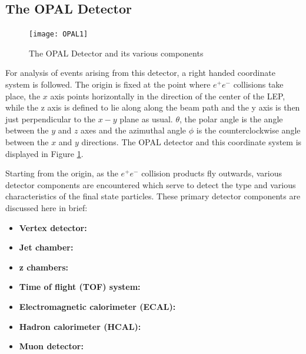 \subsection{The OPAL Detector}
\begin{figure}[H]
\centering
\texttt{[image: OPAL1]}
\caption{The OPAL Detector and its various components}
\label{fig:OPAL}
\end{figure}

For analysis of events arising from this detector, a right handed coordinate system is followed. The origin is fixed at the point where $e^{+}e^{-}$ collisions take place, the $x$ axis points horizontally in the direction of the center of the LEP, while the z axis is defined to lie along along the beam path and the y axis is then just perpendicular to the $x-y$ plane as usual. $\theta$, the polar angle is the angle between the $y$ and $z$ axes and the azimuthal angle $\phi$ is the counterclockwise angle between the $x$ and $y$ directions. The OPAL detector and this coordinate system is displayed in Figure \ref{fig:OPAL}.

Starting from the origin, as the $e^{+}e^{-}$ collision products fly outwards, various detector components are encountered which serve to detect the type and various characteristics of the final state particles. These primary detector components are discussed here in brief:
\begin{itemize}
\item \textbf{Vertex detector:}
\item \textbf{Jet chamber:}
\item \textbf{z chambers:}
\item \textbf{Time of flight (TOF) system:}
\item \textbf{Electromagnetic calorimeter (ECAL):}
\item \textbf{Hadron calorimeter (HCAL):}
\item \textbf{Muon detector:}
\end{itemize}
